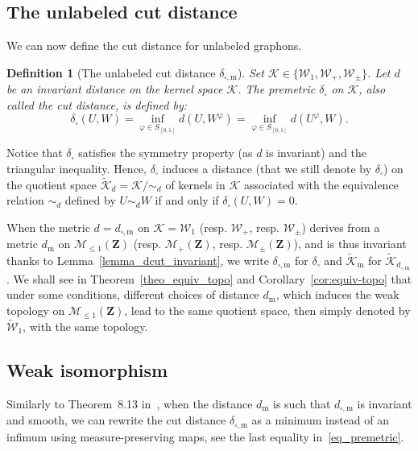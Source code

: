 \documentclass{amsart}
\theoremstyle{plain}
\newtheorem{defin}[Th]{Definition}
\theoremstyle{definition}
\newcommand{\Space}{\mathbf{Z}}
\newcommand{\signed}{\pm}
\newcommand{\ck}{\mathcal{K}}
\newcommand{\cK}{\mathcal{K}}
\newcommand{\SubProba}{\mathcal{M}_{\leq1}(\Space)}
\newcommand{\Meas}{\mathcal{M}_+(\Space)}
\newcommand{\SignedMeas}{\mathcal{M}_{\pm}(\Space)}
\newcommand{\Graphon}{\mathcal{W}_1}
\newcommand{\Kernel}{\mathcal{W}_{\signed}}
\newcommand{\Kernelp}{\mathcal{W}_{+}}
\newcommand{\UGraphon}{\widetilde{\mathcal{W}}_1}
\newcommand{\cKd}{\widetilde{\ck}_{d}}
\newcommand{\cKm}{\widetilde{\ck}_{\m}}
\newcommand{\cKdm}{\widetilde{\ck}_{\dcut}}
\newcommand{\InvRelabel}{S_{[0,1]}}
\newcommand{\m}{\mathrm{m}}
\newcommand{\simd}{\sim_{d}}
\newcommand{\dmeas}{d_\m}
\newcommand{\dcut}{d_{\square,\m}}
\newcommand{\ddcut}{\delta_{\square,\m}}
\newcommand{\dd}{\delta_{\square}}
\begin{document}
\subsection{The unlabeled  cut distance}
	\label{subsection_unlabeled_cut_distance}


We can now define the cut distance for unlabeled graphons.

\begin{defin}[The unlabeled cut distance $\ddcut$]\label{def:ddcut}
  Set  $\ck\in\{\Graphon,  \Kernelp,  \Kernel\}$.   Let  $d$  be  an
  invariant distance on the kernel space $\ck$.  The premetric $\dd$
  on $\ck$, also called the \emph{cut distance}, is defined by:
\begin{equation}\label{def_ddcut}
\dd(U,W) = \inf_{\varphi\in\InvRelabel} d(U,W^\varphi)	
= \inf_{\varphi\in\InvRelabel} d\left(U^{\varphi},W\right)		 .
\end{equation}
\end{defin}


Notice that  $\dd$ satisfies  the symmetry  property (as  $d$  is
invariant)  and  the triangular
inequality.  Hence, $\dd$   induces a
distance  (that we  still  denote  by $\dd $)  on  the quotient  space
$\cKd = \ck / \simd$
of   kernels in $\ck$  associated
with the equivalence relation $\simd$ defined by
$U\simd W$  if and only if  $\dd(U,W)=0$.

 When  the metric $d=\dcut$ on $\cK=\Graphon$ (resp.
$\Kernelp$, resp. $\Kernel$)
derives from a metric $\dmeas$ on $\SubProba$ (resp. $\Meas$, resp. $\SignedMeas$), and
is thus  invariant thanks to Lemma~\ref{lemma_dcut_invariant},  we write
$\ddcut$ for $\dd$ and $\cKm$ for $\cKdm$. 
We    shall    see    in
Theorem~\ref{theo_equiv_topo} and Corollary~\ref{cor:equiv-topo}
that  under some conditions,  different choices
of distance $\dmeas$, which induces the weak topology on $\SubProba$, lead
to the same quotient space, then simply denoted by $\UGraphon$, with the same topology.


\subsection{Weak isomorphism}
\label{section_weak_isomorphism}


Similarly to Theorem~8.13 in~\cite{Lovasz},
when the distance $\dmeas$ is such that $\dcut$ is invariant and smooth,
we can rewrite the cut distance $\ddcut$ as a minimum instead of an infimum
using measure-preserving maps, see the last equality in~\eqref{eq_premetric}.  
\end{document}
